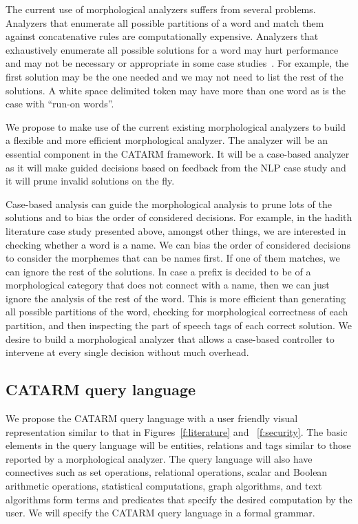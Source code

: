 \documentclass[12pt]{article}
\begin{document}
{The current use of morphological analyzers suffers from 
several problems. 
Analyzers that enumerate all possible partitions of a word
and match them against concatenative rules are computationally 
expensive. 
Analyzers that exhaustively enumerate all possible solutions 
for a word may hurt performance and may
not be necessary or appropriate in some case studies~\cite{Maamouri:10}. 
For example, the first solution may be the one needed and 
we may not need to list the rest of the solutions. 
A white space delimited token may have more than one word
as is the case with ``run-on words''.

We propose to make use of the current existing morphological
analyzers to build a flexible and more efficient
morphological analyzer. 
The analyzer will be an essential
component in the CATARM framework. 
It will be a case-based analyzer as it will make guided decisions
based on feedback from the NLP case study and it will prune
invalid solutions on the fly. 

Case-based analysis can guide the morphological analysis
to prune lots of the solutions and to bias the order of considered
decisions. 
For example, in the hadith literature case study presented above, 
amongst other things, we are interested in checking whether a 
word is a name.  
We can bias the order of considered decisions to consider the 
morphemes that can be names first. 
If one of them matches, we can ignore the rest of the solutions. 
In case a prefix is decided to be of a morphological category
that does not connect with a name, then we can just ignore
the analysis of the rest of the word. 
This is more efficient than generating all possible partitions
of the word, checking for morphological correctness of each 
partition, and then inspecting the part of speech tags of each
correct solution. 
We desire to build a morphological analyzer that allows a 
case-based controller to intervene at every single decision
without much overhead. 

\subsection{CATARM query language}
\label{s:design:query}

We propose the CATARM query language with a user friendly
visual representation similar to that in Figures~\ref{f:literature} and
~\ref{f:security}. 
The basic elements in the query language will be entities, relations
and tags similar to those reported by a morphological analyzer. 
The query language will also have connectives such as set operations, 
relational operations, 
scalar and Boolean arithmetic operations, 
statistical computations, graph algorithms, and text algorithms
form terms and predicates that specify the desired computation
by the user. 
We will specify the CATARM query language in a formal grammar.

}
\end{document}

